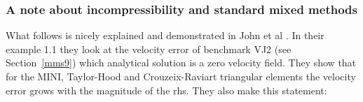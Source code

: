 \subsubsection{A note about incompressibility and standard mixed methods}

What follows is nicely explained and demonstrated in John et al \cite{jolm17}. In their 
example 1.1 they look at the velocity error of benchmark VJ2 (see Section~\ref{mms9}) 
which analytical solution is a zero velocity field. They show that for the MINI, 
Taylor-Hood and Crouzeix-Raviart triangular elements the velocity error grows 
with the magnitude of the rhs. They also make this statement:




